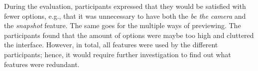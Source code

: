 During the evaluation, participants expressed that they would be satisfied with fewer options, e.g., that it was unnecessary to have both the \textit{be the camera} and the \textit{snapshot} feature. The same goes for the multiple ways of previewing. The participants found that the amount of options were maybe too high and cluttered the interface. However, in total, all features were used by the different participants; hence, it would require further investigation to find out what features were redundant.


